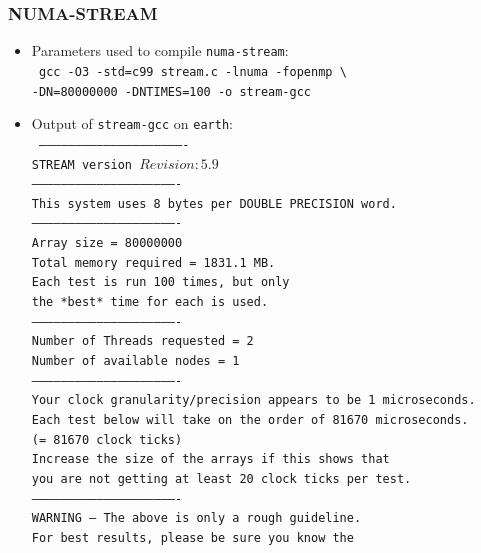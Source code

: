 \subsubsection{NUMA-STREAM}
\begin{itemize}
    \item Parameters used to compile \texttt{numa-stream}: \\
    \texttt{
        gcc -O3 -std=c99 stream.c -lnuma -fopenmp \textbackslash \\
        -DN=80000000 -DNTIMES=100 -o stream-gcc
    }
    
    \item Output of \texttt{stream-gcc} on \texttt{earth}: \\
    \texttt{\tiny 
------------------------------------------------------------- \\
STREAM version $Revision: 5.9 $ \\
------------------------------------------------------------- \\
This system uses 8 bytes per DOUBLE PRECISION word. \\
------------------------------------------------------------- \\
Array size = 80000000 \\
Total memory required = 1831.1 MB. \\
Each test is run 100 times, but only \\
the *best* time for each is used. \\
------------------------------------------------------------- \\
Number of Threads requested = 2 \\
Number of available nodes = 1 \\
------------------------------------------------------------- \\
Your clock granularity/precision appears to be 1 microseconds. \\
Each test below will take on the order of 81670 microseconds. \\
   (= 81670 clock ticks) \\
Increase the size of the arrays if this shows that \\
you are not getting at least 20 clock ticks per test. \\
------------------------------------------------------------- \\
WARNING -- The above is only a rough guideline. \\
For best results, please be sure you know the \\
}
\end{itemize}
